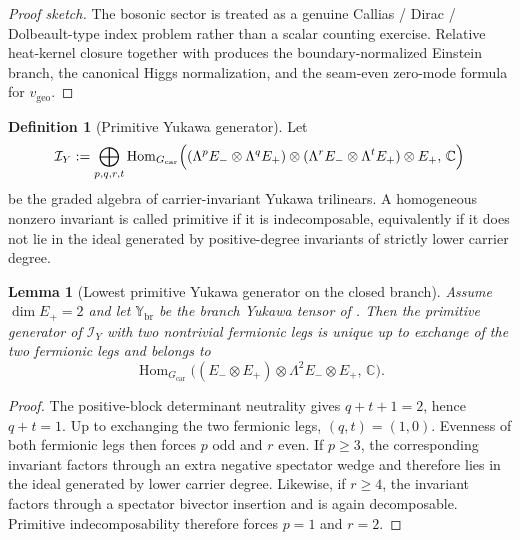 \documentclass[11pt,a4paper]{article}
\newtheorem{lemma}[theorem]{Lemma}
\theoremstyle{definition}
\newtheorem{definition}[theorem]{Definition}
\theoremstyle{remark}
\newcommand{\vgeo}{v_{\mathrm{geo}}}
\begin{document}
\begin{proof}[Proof sketch]
The bosonic sector is treated as a genuine Callias / Dirac / Dolbeault-type index problem rather
than a scalar counting exercise. Relative heat-kernel closure together with
produces the boundary-normalized Einstein branch, the canonical Higgs normalization, and the
seam-even zero-mode formula for $\vgeo$.
\end{proof}

\begin{definition}[Primitive Yukawa generator]
\label{def:primitive-yukawa-generator}
Let
\[
\mathcal I_Y
:=
\bigoplus_{p,q,r,t}
\operatorname{Hom}_{G_{\mathrm{car}}}
\Bigl(
(\Lambda^p E_-\otimes \Lambda^q E_+)
\otimes
(\Lambda^r E_-\otimes \Lambda^t E_+)
\otimes E_+,\,
\mathbb C
\Bigr)
\]
be the graded algebra of carrier-invariant Yukawa trilinears. A homogeneous nonzero invariant is
called primitive if it is indecomposable, equivalently if it does not lie in the ideal generated by
positive-degree invariants of strictly lower carrier degree.
\end{definition}

\begin{lemma}[Lowest primitive Yukawa generator on the closed branch]
\label{lem:lowest-primitive-yukawa-generator}
Assume $\dim E_+=2$ and let $\mathbb Y_{\mathrm{br}}$ be the branch Yukawa tensor of
. Then the primitive generator of
$\mathcal I_Y$ with two nontrivial fermionic legs is unique up to exchange of the two fermionic
legs and belongs to
\[
\operatorname{Hom}_{G_{\mathrm{car}}}
\bigl((E_-\otimes E_+)\otimes \Lambda^2 E_-\otimes E_+,\,\mathbb C\bigr).
\]
\end{lemma}

\begin{proof}
The positive-block determinant neutrality gives $q+t+1=2$, hence $q+t=1$. Up to exchanging the two
fermionic legs, $(q,t)=(1,0)$. Evenness of both fermionic legs then forces $p$ odd and $r$ even.
If $p\ge 3$, the corresponding invariant factors through an extra negative spectator wedge and
therefore lies in the ideal generated by lower carrier degree. Likewise, if $r\ge 4$, the
invariant factors through a spectator bivector insertion and is again decomposable. Primitive
indecomposability therefore forces $p=1$ and $r=2$.
\end{proof}
\end{document}
